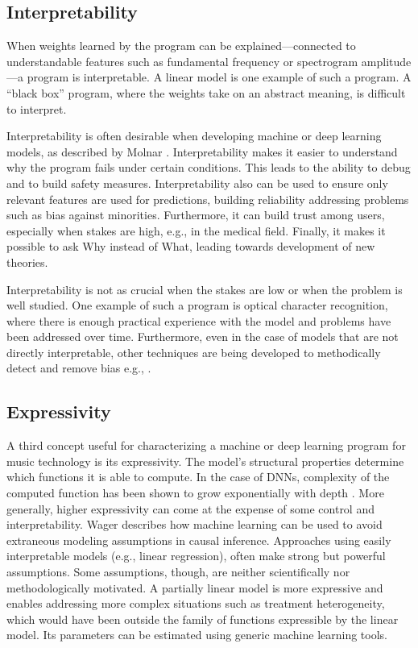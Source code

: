 \subsection{Interpretability}
\label{sec:interpretability}
When weights learned by the program can be explained---connected to understandable features such as fundamental frequency or spectrogram amplitude---a program is interpretable. A linear model is one example of such a program. A ``black box'' program, where the weights take on an abstract meaning, is difficult to interpret. 

Interpretability is often desirable when developing machine or deep learning models, as described by Molnar \cite{molnar2020interpretable}. Interpretability makes it easier to understand why the program fails under certain conditions. This leads to the ability to debug and to build safety measures. Interpretability also can be used to ensure only relevant features are used for predictions, building reliability addressing problems such as bias against minorities. Furthermore, it can build trust among users, especially when stakes are high, e.g., in the medical field. Finally, it makes it possible to ask Why instead of What, leading towards development of new theories. 

Interpretability is not as crucial when the stakes are low or when the problem is well studied. One example of such a program is optical character recognition, where there is enough practical experience with the model and problems have been addressed over time. Furthermore, even in the case of models that are not directly interpretable, other techniques are being developed to methodically detect and remove bias e.g., \cite{jiang2019identifying}.

\subsection{Expressivity}
A third concept useful for characterizing a machine or deep learning program for music technology is its expressivity. The model's structural properties determine which functions it is able to compute. In the case of DNNs, complexity of the computed function has been shown to grow exponentially with depth \cite{raghu2017expressive}. More generally, higher expressivity can come at the expense of some control and interpretability. Wager describes how machine learning can be used to avoid extraneous modeling assumptions in causal inference. \cite{wager2019causal} Approaches using easily interpretable models (e.g., linear regression), often make strong but powerful assumptions. Some assumptions, though, are neither scientifically nor methodologically motivated. A partially linear model is more expressive and enables addressing more complex situations such as treatment heterogeneity, which would have been outside the family of functions expressible by the linear model. Its parameters can be estimated using generic machine learning tools. 

